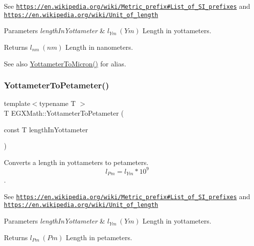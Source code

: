 See \href{https://en.wikipedia.org/wiki/Metric_prefix#List_of_SI_prefixes}{\tt https\+://en.\+wikipedia.\+org/wiki/\+Metric\+\_\+prefix\#\+List\+\_\+of\+\_\+\+S\+I\+\_\+prefixes} and \href{https://en.wikipedia.org/wiki/Unit_of_length}{\tt https\+://en.\+wikipedia.\+org/wiki/\+Unit\+\_\+of\+\_\+length} 
\begin{DoxyParams}{Parameters}
{\em length\+In\+Yottameter} & $ l_{Ym}\ (Ym)$ Length in yottameters. \\
\hline
\end{DoxyParams}
\begin{DoxyReturn}{Returns}
$ l_{nm}\ (nm)$ Length in nanometers. 
\end{DoxyReturn}
\begin{DoxySeeAlso}{See also}
\mbox{\hyperlink{group___e_g_x_math-_conversions-_length_conversions-_s_i-_yottameter-_non-_s_i_gaad96d515763b1dfbcd968020e1b97de4}{Yottameter\+To\+Micron()}} for alias. 
\end{DoxySeeAlso}
\mbox{\label{group___e_g_x_math-_conversions-_length_conversions-_s_i-_yottameter-_s_i_gaf4b5d397ea5debc0bd5195ad3a5c23d5}} 
\subsubsection{\texorpdfstring{Yottameter\+To\+Petameter()}{YottameterToPetameter()}}
{\footnotesize\ttfamily template$<$typename T $>$ \\
T E\+G\+X\+Math\+::\+Yottameter\+To\+Petameter (\begin{DoxyParamCaption}\item[{const T}]{length\+In\+Yottameter }\end{DoxyParamCaption})}



Converts a length in yottameters to petameters. \[ l_{Pm}=l_{Ym} * 10^{9} \]. 

See \href{https://en.wikipedia.org/wiki/Metric_prefix#List_of_SI_prefixes}{\tt https\+://en.\+wikipedia.\+org/wiki/\+Metric\+\_\+prefix\#\+List\+\_\+of\+\_\+\+S\+I\+\_\+prefixes} and \href{https://en.wikipedia.org/wiki/Unit_of_length}{\tt https\+://en.\+wikipedia.\+org/wiki/\+Unit\+\_\+of\+\_\+length} 
\begin{DoxyParams}{Parameters}
{\em length\+In\+Yottameter} & $ l_{Ym}\ (Ym)$ Length in yottameters. \\
\hline
\end{DoxyParams}
\begin{DoxyReturn}{Returns}
$ l_{Pm}\ (Pm)$ Length in petameters. 
\end{DoxyReturn}
\mbox{\label{group___e_g_x_math-_conversions-_length_conversions-_s_i-_yottameter-_s_i_ga7af9d1314de06921546f079641c033b2}} 
